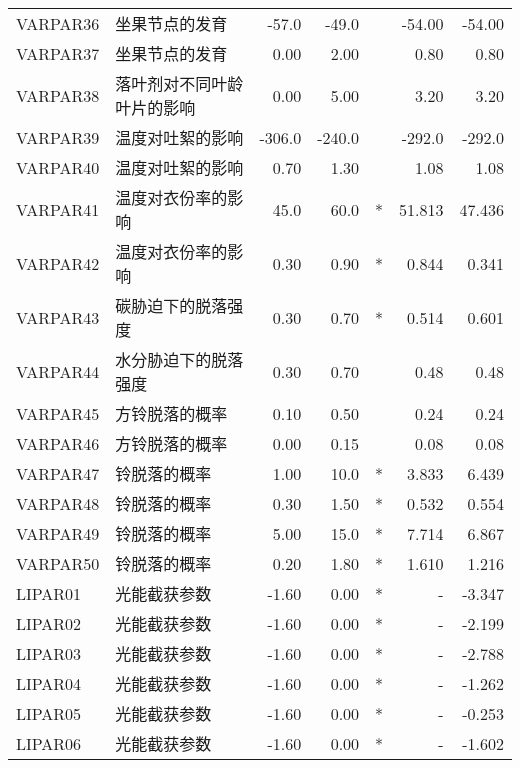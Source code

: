 \begin{longtable}{llrrcrr}
    VARPAR36 & 坐果节点的发育             & -57.0  & -49.0  &     & -54.00  & -54.00  \\
    VARPAR37 & 坐果节点的发育             & 0.00   & 2.00   &     & 0.80    & 0.80    \\
    VARPAR38 & 落叶剂对不同叶龄叶片的影响 & 0.00   & 5.00   &     & 3.20    & 3.20    \\
    VARPAR39 & 温度对吐絮的影响           & -306.0 & -240.0 &     & -292.0  & -292.0  \\
    VARPAR40 & 温度对吐絮的影响           & 0.70   & 1.30   &     & 1.08    & 1.08    \\
    VARPAR41 & 温度对衣份率的影响         & 45.0   & 60.0   & *   & 51.813  & 47.436  \\
    VARPAR42 & 温度对衣份率的影响         & 0.30   & 0.90   & *   & 0.844   & 0.341   \\
    VARPAR43 & 碳胁迫下的脱落强度         & 0.30   & 0.70   & *   & 0.514   & 0.601   \\
    VARPAR44 & 水分胁迫下的脱落强度       & 0.30   & 0.70   &     & 0.48    & 0.48    \\
    VARPAR45 & 方铃脱落的概率             & 0.10   & 0.50   &     & 0.24    & 0.24    \\
    VARPAR46 & 方铃脱落的概率             & 0.00   & 0.15   &     & 0.08    & 0.08    \\
    VARPAR47 & 铃脱落的概率               & 1.00   & 10.0   & *   & 3.833   & 6.439   \\
    VARPAR48 & 铃脱落的概率               & 0.30   & 1.50   & *   & 0.532   & 0.554   \\
    VARPAR49 & 铃脱落的概率               & 5.00   & 15.0   & *   & 7.714   & 6.867   \\
    VARPAR50 & 铃脱落的概率               & 0.20   & 1.80   & *   & 1.610   & 1.216   \\
    LIPAR01  & 光能截获参数               & -1.60  & 0.00   & *   & -       & -3.347  \\
    LIPAR02  & 光能截获参数               & -1.60  & 0.00   & *   & -       & -2.199  \\
    LIPAR03  & 光能截获参数               & -1.60  & 0.00   & *   & -       & -2.788  \\
    LIPAR04  & 光能截获参数               & -1.60  & 0.00   & *   & -       & -1.262  \\
    LIPAR05  & 光能截获参数               & -1.60  & 0.00   & *   & -       & -0.253  \\
    LIPAR06  & 光能截获参数               & -1.60  & 0.00   & *   & -       & -1.602  \\

\end{longtable}
